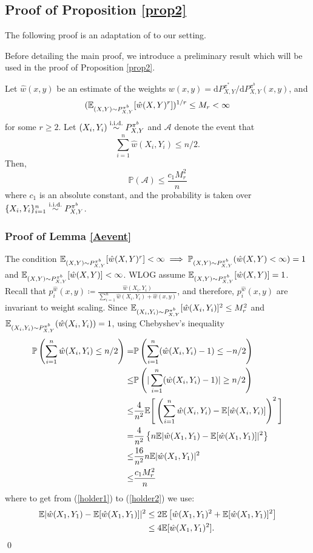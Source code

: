 \subsection{Proof of Proposition \ref{prop2}}
The following proof is an adaptation of \cite[Proposition 1]{lei2020conformal} to our setting.

Before detailing the main proof, we introduce a preliminary result which will be used in the proof of Proposition \ref{prop2}.

%
%
%
%
%
%

%
%
%
%
%
%

\begin{lemma}\label{Aevent}
Let $\hat{w}(x,y)$ be an estimate of the weights $w(x,y) = \mathrm{d}P^{\pi^{*}}_{X,Y}/\mathrm{d}P^{\pi^{b}}_{X,Y}(x,y)$, and $$(\mathbb{E}_{(X,Y)\sim P^{\pi^b}_{X,Y}}[\hat{w}(X,Y)^r])^{1/r} \leq M_r < \infty$$ for some $r \geq 2$. Let $(X_i, Y_i) \overset{\textup{i.i.d.}}{\sim} P^{\pi^b}_{X,Y}$ and $\mathcal{A}$ denote the event that 
\[
\sum_{i=1}^n \hat{w}(X_i, Y_i) \leq n/2.
\]
Then, 
\[
\mathbb{P}(\mathcal{A}) \leq \frac{c_1 M_r^2}{n}
\]
where $c_1$ is an absolute constant, and the probability is taken over $\{X_i, Y_i\}_{i=1}^n  \overset{\textup{i.i.d.}}{\sim} P^{\pi^b}_{X,Y}$.
\end{lemma}

\subsubsection*{Proof of Lemma \ref{Aevent}}
The condition $\mathbb{E}_{(X,Y)\sim P^{\pi^b}_{X,Y}}[\hat{w}(X, Y)^r] < \infty \implies \mathbb{P}_{(X,Y)\sim P^{\pi^b}_{X,Y}}(\hat{w}(X, Y)< \infty) = 1$ and $\mathbb{E}_{(X,Y)\sim P^{\pi^b}_{X,Y}}[\hat{w}(X, Y)]<\infty$. WLOG assume $\mathbb{E}_{(X,Y)\sim P^{\pi^b}_{X,Y}}[\hat{w}(X, Y)] = 1$. Recall that $p_{i}^{\hat{w}}(x, y) \coloneqq \frac{\hat{w}(X_i, Y_i)}{\sum_{i=1}^n \hat{w}(X_i, Y_i) + \hat{w}(x,y)}$, and therefore, $p_i^{\hat{w}}(x,y)$ are invariant to weight scaling. Since $\mathbb{E}_{(X_i, Y_i) \sim P^{\pi^b}_{X,Y}}[\hat{w}(X_i, Y_i)]^2 \leq M_r^2$ and $\mathbb{E}_{(X_i, Y_i) \sim P^{\pi^b}_{X,Y}}(\hat{w}(X_i, Y_i)) = 1$, using Chebyshev's inequality %
%
%
%
%
%
%
%
%
%
\begin{align}
    \mathbb{P}\left( \sum_{i=1}^n  \hat{w}(X_i, Y_i) \leq n/2 \right) =& \mathbb{P}\left( \sum_{i=1}^n  (\hat{w}(X_i, Y_i)-1) \leq -n/2 \right) \nonumber\\
    \leq& \mathbb{P}\left( |\sum_{i=1}^n  (\hat{w}(X_i, Y_i) -1)| \geq n/2 \right) \nonumber \\
    \leq& \frac{4}{n^2}\mathbb{E} \Bigg[\left( \sum_{i=1}^n \hat{w}(X_i, Y_i) - \mathbb{E}[\hat{w}(X_i, Y_i)] \right)^2\Bigg] \nonumber \\
    =& \frac{4}{n^2} \left\{ n \mathbb{E} |\hat{w}(X_1, Y_1) - \mathbb{E}[\hat{w}(X_1, Y_1)] |^2\right\}  \label{holder1}\\ 
    \leq& \frac{16}{n^2}  n \mathbb{E} |\hat{w}(X_1, Y_1)|^2  \label{holder2} \\
    \leq& \frac{c_1 M_r^2}{n} \nonumber
\end{align}
where to get from (\ref{holder1}) to (\ref{holder2}) we use:
%
%
%
\begin{align}
    \mathbb{E} |\hat{w}(X_1, Y_1) - \mathbb{E}[\hat{w}(X_1, Y_1)] |^2 &\leq 2 \mathbb{E} \left[\hat{w}(X_1, Y_1)^2 + \mathbb{E}[\hat{w}(X_1, Y_1)]^2 \right] \nonumber\\
    &\leq 4\mathbb{E}[\hat{w}(X_1, Y_1)^2]. \nonumber
\end{align}
\qed


